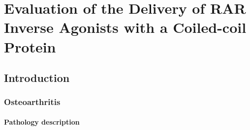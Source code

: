 \chapter{Evaluation of the Delivery of RAR Inverse Agonists with a Coiled-coil
Protein}
\label{chap:comp}
\begin{refsection}

\section{Introduction}

\subsection{Osteoarthritis}

\subsubsection{Pathology description}


\end{refsection}
